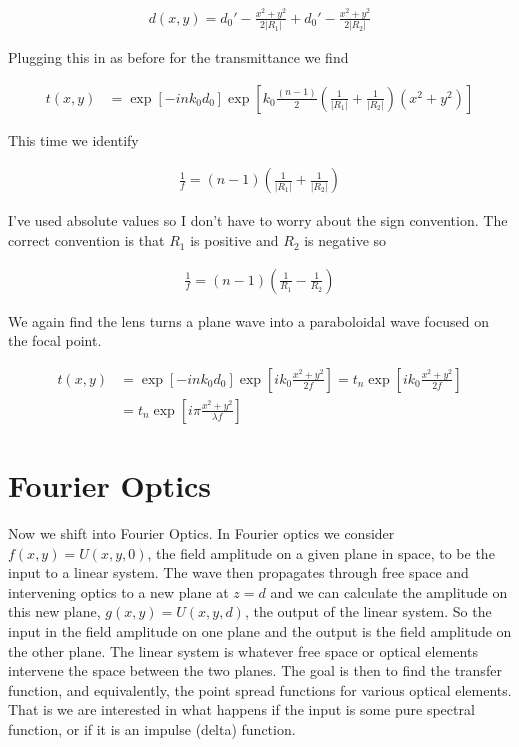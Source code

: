 \documentclass[12pt]{article}
\begin{document}
\begin{align}
d(x,y) = d_0' - \frac{x^2+y^2}{2|R_1|} + d_0' - \frac{x^2+y^2}{2|R_2|}
\end{align}

Plugging this in as before for the transmittance we find

\begin{align}
t(x,y) &= \exp[-i n k_0 d_0] \exp\left[k_0 \frac{(n-1)}{2}\left(\frac{1}{|R_1|}+\frac{1}{|R_2|}\right) (x^2+y^2)\right]
\end{align}

This time we identify 

\begin{align}
\frac{1}{f} = (n-1) \left(\frac{1}{|R_1|} + \frac{1}{|R_2|}\right)
\end{align}

I've used absolute values so I don't have to worry about the sign convention. The correct convention is that $R_1$ is positive and $R_2$ is negative so

\begin{align}
\frac{1}{f} = (n-1) \left(\frac{1}{R_1} - \frac{1}{R_2}\right)
\end{align}

We again find the lens turns a plane wave into a paraboloidal wave focused on the focal point.

\begin{align}
t(x,y) &= \exp[-i n k_0 d_0] \exp\left[ik_0\frac{x^2+y^2}{2f}\right] = t_n \exp\left[ik_0\frac{x^2+y^2}{2f}\right]\\
&= t_n \exp\left[i \pi \frac{x^2+y^2}{\lambda f}\right]
\end{align}

\section{Fourier Optics}
Now we shift into Fourier Optics. In Fourier optics we consider $f(x,y) = U(x,y,0)$, the field amplitude on a given plane in space, to be the input to a linear system. The wave then propagates through free space and intervening optics to a new plane at $z=d$ and we can calculate the amplitude on this new plane, $g(x,y) = U(x,y,d)$, the output of the linear system. So the input in the field amplitude on one plane and the output is the field amplitude on the other plane. The linear system is whatever free space or optical elements intervene the space between the two planes. The goal is then to find the transfer function, and equivalently, the point spread functions for various optical elements. That is we are interested in what happens if the input is some pure spectral function, or if it is an impulse (delta) function.
\end{document}

